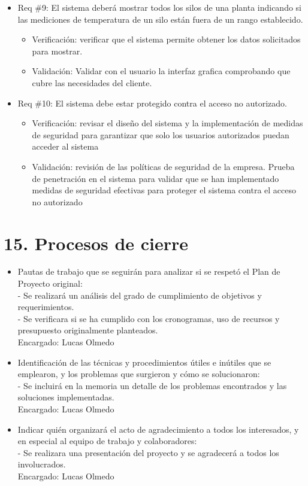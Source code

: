 \documentclass[
11pt, %
]{charter}
\begin{document}
\begin{itemize}
\item Req \#9: El sistema deberá mostrar todos los silos de una planta indicando si las mediciones
de temperatura de un silo están fuera de un rango establecido.
\begin{itemize}
	\item Verificación: verificar que el sistema permite obtener los datos solicitados para mostrar. 
	\item Validación: Validar con el usuario la interfaz grafica comprobando que cubre las necesidades del cliente. 
\end{itemize}

\item Req \#10: El sistema debe estar protegido contra el acceso no autorizado.
\begin{itemize}
	\item Verificación: revisar el diseño del sistema y la implementación de medidas de seguridad para garantizar que solo los usuarios autorizados puedan acceder al sistema
	\item Validación: revisión de las políticas de seguridad de la empresa. Prueba de penetración en el sistema para validar que se han implementado medidas de seguridad efectivas para proteger el sistema contra el acceso no autorizado
\end{itemize}

\end{itemize}



\section{15. Procesos de cierre}    
\label{sec:cierre}


\begin{itemize}
	\item Pautas de trabajo que se seguirán para analizar si se respetó el Plan de Proyecto original:\\
	 - Se realizará un análisis del grado de cumplimiento de objetivos y requerimientos.\\
	 - Se verificara si se ha cumplido con los cronogramas, uso de recursos y presupuesto
originalmente planteados.\\
	Encargado: Lucas Olmedo
	\item Identificación de las técnicas y procedimientos útiles e inútiles que se emplearon, y los problemas que surgieron y cómo se solucionaron:\\
	 - Se incluirá en la memoria un detalle de los problemas encontrados y las soluciones implementadas.\\
	Encargado: Lucas Olmedo
	\item Indicar quién organizará el acto de agradecimiento a todos los interesados, y en especial al equipo de trabajo y colaboradores:\\
	  - Se realizara una presentación del proyecto y se agradecerá a todos los involucrados.\\
	  Encargado: Lucas Olmedo\\
\end{itemize}
\end{document}
